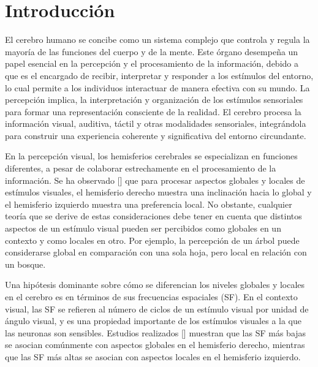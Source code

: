 \chapter*{Introducción}\label{chapter:introduction}

El cerebro humano se concibe como un sistema complejo que controla y regula la mayoría de las funciones del cuerpo y de la mente. Este \'organo desempeña un papel esencial en la percepción y el procesamiento de la información, debido a que es el encargado de recibir, interpretar y responder a los estímulos del entorno, lo cual permite a los individuos interactuar de manera efectiva con su mundo. La percepción implica, la interpretación y organización de los estímulos sensoriales para formar una representación consciente de la realidad. El cerebro procesa la información visual, auditiva, táctil y otras modalidades sensoriales, integrándola para construir una experiencia coherente y significativa del entorno circundante.

En la percepci\'on visual, los hemisferios cerebrales se especializan en funciones diferentes, a pesar de colaborar estrechamente en el procesamiento de la informaci\'on. Se ha observado [\cite{flevaris_spatial_2016}] que para procesar aspectos globales y locales de estímulos visuales, el hemisferio derecho muestra una inclinaci\'on hacia lo global y el hemisferio izquierdo muestra una preferencia local. No obstante, cualquier teoría que se derive de estas consideraciones debe tener en cuenta que distintos aspectos de un estímulo visual pueden ser percibidos como globales en un contexto y como locales en otro. Por ejemplo, la percepción de un árbol puede considerarse global en comparación con una sola hoja, pero local en relación con un bosque.

Una hipótesis dominante sobre cómo se diferencian los niveles globales y locales en el cerebro es en términos de sus frecuencias espaciales (SF). En el contexto visual, las SF se refieren al número de ciclos de un estímulo visual por unidad de ángulo visual, y es una propiedad importante de los estímulos visuales a la que las neuronas son sensibles. Estudios realizados [\cite{flevaris_spatial_2016}] muestran que las SF más bajas se asocian comúnmente con aspectos globales en el hemisferio derecho, mientras que las SF más altas se asocian con aspectos locales en el hemisferio izquierdo. 



